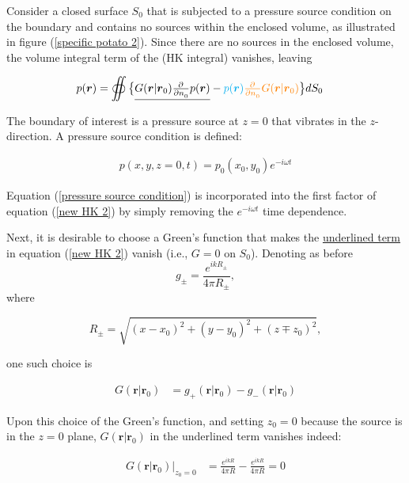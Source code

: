 \documentclass[12pt]{article}%
\begin{document}
Consider a closed surface $S_0$ that is subjected to a pressure source condition on the boundary and contains no sources within the enclosed volume, as illustrated in figure (\ref{specific potato 2}). Since there are no sources in the enclosed volume, the volume integral term of the (HK integral) vanishes, leaving

\begin{align}\label{new HK 2}
    p(\boldsymbol r) &= \oiint \big\lbrace \underline{G(\boldsymbol r| \boldsymbol r_0) \pd{}{n_0} p(\boldsymbol r)} -  \color{cyan}p(\boldsymbol r) \color{orange}\pd{}{n_0}  G(\boldsymbol r| \boldsymbol r_0)\color{black} \big\rbrace dS_0
\end{align}

\noindent The boundary of interest is a pressure source at $z=0$ that vibrates in the $z$-direction. A pressure source condition is defined:

\begin{align}\label{pressure source condition}
p(x,y,z=0,t) = p_0 (x_0,y_0) e^{-i\omega t}    
\end{align}

\noindent Equation (\ref{pressure source condition}) is incorporated into the \color{cyan}first factor \color{black} of equation (\ref{new HK 2}) by simply removing the $e^{-i\omega t}$ time dependence.
 
Next, it is desirable to choose a Green's function that makes the \underline{underlined term} in equation (\ref{new HK 2}) vanish (i.e., $G = 0$ on $S_0$). Denoting as before
$$g_\pm = \frac{e^{ikR_\pm}}{4\pi R_\pm},$$ 
\noindent where 

$$R_\pm = \sqrt{(x-x_0)^2 + (y-y_0)^2 + (z\mp z_0)^2},$$ 

\noindent one such choice is 

\begin{align}\label{Green's function for derivation}
G(\boldsymbol r | \boldsymbol r_0) &= g_+(\boldsymbol r | \boldsymbol r_0) - g_-(\boldsymbol r | \boldsymbol r_0)   
\end{align}
 
\noindent Upon this choice of the Green's function, and setting $z_0 = 0$ because the source is in the $z=0$ plane, $G(\boldsymbol r|\boldsymbol r_0)$ in the underlined term vanishes indeed:

\begin{align*}
G(\boldsymbol r|\boldsymbol r_0) \bigg\rvert_{z_0=0} &=  \frac{e^{ikR}}{4\pi R} - \frac{e^{ikR}}{4\pi R} =0
\end{align*}
\end{document}
